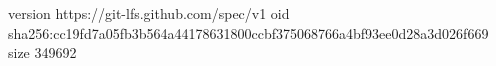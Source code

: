 version https://git-lfs.github.com/spec/v1
oid sha256:cc19fd7a05fb3b564a44178631800ccbf375068766a4bf93ee0d28a3d026f669
size 349692
